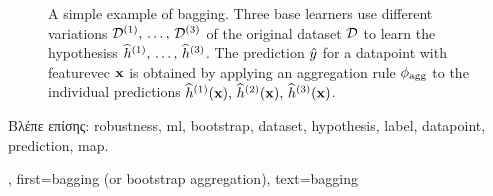 {{\begin{figure}[H]
\begin{center}
		\caption{A simple example of bagging. Three base learners use different variations 
	      	$\mathcal{D}^{(1)},\,\ldots,\,\mathcal{D}^{(3)}$ of the original \gls{dataset} $\mathcal{D}$ to 
		learn the \gls{hypothesis}s $\widehat{h}^{(1)},\,\ldots,\,\widehat{h}^{(3)}$. 
		The \gls{prediction} $\hat{y}$ for a \gls{datapoint} with \gls{featurevec} ${\bf x}$ 
		is obtained by applying an aggregation rule $\phi_{\rm agg}$ to the individual \gls{prediction}s 
		$\widehat{h}^{(1)}({\bf x}),\,\widehat{h}^{(2)}({\bf x}),\,\widehat{h}^{(3)}({\bf x})$. }
		\end{center}
		\end{figure}
		\foreignlanguage{greek}{Βλέπε επίσης:} \gls{robustness}, \gls{ml}, \gls{bootstrap}, \gls{dataset}, 
		\gls{hypothesis}, \gls{label}, \gls{datapoint}, \gls{prediction}, \gls{map}.},
	first={bagging (or bootstrap aggregation)},
	text={bagging}  
}


